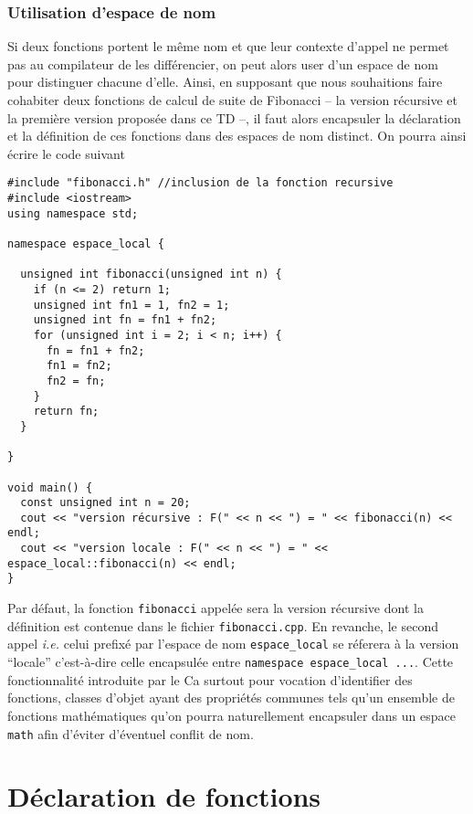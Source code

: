 \documentclass{book}
\newcommand{\inline}[1]{\texttt{#1}}
\newcommand{\cpp}{\mbox{C\vspace{.5em}\protect\raisebox{.2ex}{\footnotesize++~}}}
\begin{document}
\begin{correction}
\subsubsection{Utilisation d'espace de nom}
Si deux fonctions portent le même nom et que leur contexte d'appel ne permet pas
au compilateur de les différencier, on peut alors user d'un espace de nom pour
distinguer chacune d'elle. Ainsi, en supposant que nous souhaitions faire
cohabiter deux fonctions de calcul de suite de Fibonacci -- la version récursive
et la première version proposée dans ce TD --, il faut alors encapsuler la
déclaration et la définition de ces fonctions dans des espaces de nom
distinct. On pourra ainsi écrire le code suivant

\begin{verbatim}
#include "fibonacci.h" //inclusion de la fonction recursive
#include <iostream>
using namespace std;

namespace espace_local {

  unsigned int fibonacci(unsigned int n) {
    if (n <= 2) return 1;
    unsigned int fn1 = 1, fn2 = 1;
    unsigned int fn = fn1 + fn2;
    for (unsigned int i = 2; i < n; i++) {
      fn = fn1 + fn2;
      fn1 = fn2;
      fn2 = fn;
    }
    return fn;
  }

}

void main() {
  const unsigned int n = 20;
  cout << "version récursive : F(" << n << ") = " << fibonacci(n) << endl;
  cout << "version locale : F(" << n << ") = " << espace_local::fibonacci(n) << endl;
}
\end{verbatim}

Par défaut, la fonction \texttt{fibonacci} appelée sera la version récursive dont la
définition est contenue dans le fichier \texttt{fibonacci.cpp}. En revanche, le second
appel \emph{i.e.} celui prefixé par l'espace de nom \inline{espace_local} se réferera à la version
``locale'' c'est-à-dire celle encapsulée entre \inline{namespace espace_local {...}}. Cette
fonctionnalité introduite par le \cpp a surtout pour vocation d'identifier des
fonctions, classes d'objet ayant des propriétés communes tels qu'un ensemble de
fonctions mathématiques qu'on pourra naturellement encapsuler dans un espace
\texttt{math} afin d'éviter d'éventuel conflit de nom.
\end{correction}


\section{Déclaration de fonctions}
\end{document}
